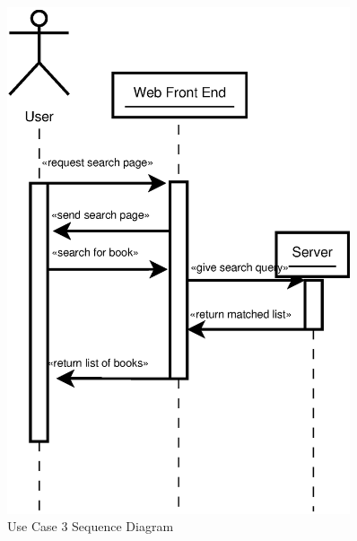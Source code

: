 \documentclass[a4paper, 10pt, oneside, draft]{article}
\begin{document}
\begin{figure}[p]
    \centering
    \includegraphics[width=0.9\textwidth]{Use_Case_3}
    \caption{Use Case 3 Sequence Diagram}
    \label{fig:usecase3_image}
\end{figure}
\end{document}
